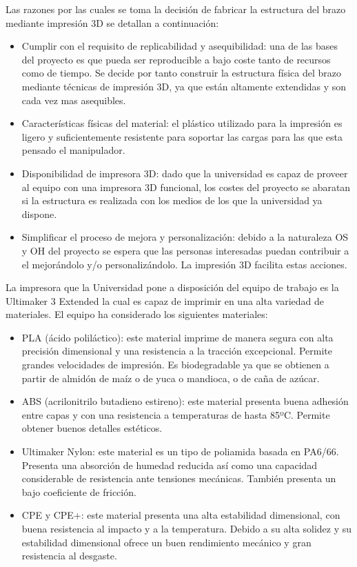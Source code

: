 Las razones por las cuales se toma la decisión de fabricar la estructura del brazo mediante impresión 3D se detallan a continuación:

\begin{itemize}
  \item Cumplir con el requisito de replicabilidad y asequibilidad: una de las bases del proyecto es que pueda ser reproducible a bajo coste tanto de recursos como de tiempo. Se decide por tanto construir la estructura física del brazo mediante técnicas de impresión 3D, ya que están altamente extendidas y son cada vez mas asequibles.
  
  \item Características físicas del material: el plástico utilizado para la impresión es ligero y suficientemente resistente para soportar las cargas para las que esta pensado el manipulador.
  
  \item Disponibilidad de impresora 3D: dado que la universidad es capaz de proveer al equipo con una impresora 3D funcional, los costes del proyecto se abaratan si la estructura es realizada con los medios de los que la universidad ya dispone.
  
  \item Simplificar el proceso de mejora y personalización: debido a la naturaleza \ac{OS} y \ac{OH} del proyecto se espera que las personas interesadas puedan contribuir a el mejorándolo y/o personalizándolo. La impresión 3D facilita estas acciones.
\end{itemize}

La impresora que la Universidad pone a disposición del equipo de trabajo es la Ultimaker 3 Extended la cual es capaz de imprimir en una alta variedad de materiales. El equipo ha considerado los siguientes materiales:

\begin{itemize}
    \item PLA (ácido poliláctico)\cite{noauthor_acido_2020}: este material imprime de manera segura con alta precisión dimensional y una resistencia a la tracción excepcional. Permite grandes velocidades de impresión. Es biodegradable ya que se obtienen a partir de almidón de maíz o de yuca o mandioca, o de caña de azúcar. 
    \item ABS (acrilonitrilo butadieno estireno)\cite{noauthor_acrilonitrilo_2020}: este material presenta buena adhesión entre capas y con una resistencia a temperaturas de hasta 85ºC. Permite obtener buenos detalles estéticos.
    \item Ultimaker Nylon: este material es un tipo de poliamida basada en PA6/66. Presenta una absorción de humedad reducida así como una capacidad considerable de resistencia ante tensiones mecánicas. También presenta un bajo coeficiente de fricción.
    \item CPE y CPE+: este material presenta una alta estabilidad dimensional, con buena resistencia al impacto y a la temperatura. Debido a su alta solidez y su estabilidad dimensional ofrece un buen rendimiento mecánico y gran resistencia al desgaste.
\end{itemize}

